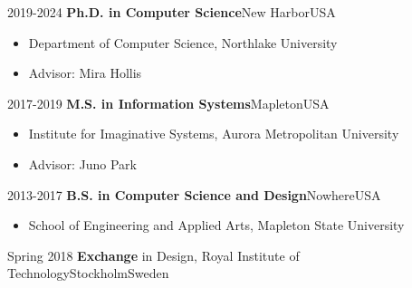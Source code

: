 %
%
%

\begin{experiences}
  \experience
    {2019-2024}   {\textbf{Ph.D. in Computer Science}}{New Harbor}{USA}{}
 {
      \begin{itemize} 
                \item Department of Computer Science, Northlake University
                \item Advisor: Mira Hollis
      \end{itemize}
   }
   {}
  \experience
    {2017-2019}   {\textbf{M.S. in Information Systems}}{Mapleton}{USA}
    {} {
              \begin{itemize}
                \item Institute for Imaginative Systems, Aurora Metropolitan University
                \item Advisor: Juno Park
              \end{itemize}
            }
  \experience
    {2013-2017}   {\textbf{B.S. in Computer Science and Design}}{Nowhere}{USA}
    {} {
              \begin{itemize}
                \item School of Engineering and Applied Arts, Mapleton State University
              \end{itemize}
    }
  \experiencesingle
    {Spring 2018} {\textbf{Exchange} in Design, Royal Institute of Technology}{Stockholm}{Sweden}
\end{experiences}